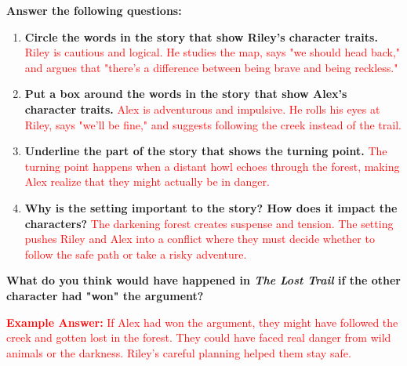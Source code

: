 \documentclass[12pt]{article}
\begin{document}
\begin{tcolorbox}[colframe=black!60, colback=white, 
coltitle=black, colbacktitle=black!15, fonttitle=\bfseries\Large, 
title=Independent Practice: \textit{The Lost Trail}, halign title=center, left=10pt, right=10pt, top=10pt, bottom=15pt]

\textbf{Answer the following questions:}
\begin{enumerate}[itemsep=1em]
    \item \textbf{Circle the words in the story that show Riley's character traits.}  
    \textcolor{red}{Riley is cautious and logical. He studies the map, says "we should head back," and argues that "there’s a difference between being brave and being reckless."}  

    \item \textbf{Put a box around the words in the story that show Alex's character traits.}  
    \textcolor{red}{Alex is adventurous and impulsive. He rolls his eyes at Riley, says "we’ll be fine," and suggests following the creek instead of the trail.}  

    \item \textbf{Underline the part of the story that shows the turning point.}  
    \textcolor{red}{The turning point happens when a distant howl echoes through the forest, making Alex realize that they might actually be in danger.}  

    \item \textbf{Why is the setting important to the story? How does it impact the characters?}  
    \textcolor{red}{The darkening forest creates suspense and tension. The setting pushes Riley and Alex into a conflict where they must decide whether to follow the safe path or take a risky adventure.}
\end{enumerate}
\end{tcolorbox}

\vspace{1em}

\begin{tcolorbox}[colframe=black!60, colback=white, 
coltitle=black, colbacktitle=black!15, fonttitle=\bfseries\Large, 
title=Exit Ticket, halign title=center, left=10pt, right=10pt, top=10pt, bottom=15pt]

\textbf{What do you think would have happened in \textit{The Lost Trail} if the other character had "won" the argument?}  

\textcolor{red}{\textbf{Example Answer:} If Alex had won the argument, they might have followed the creek and gotten lost in the forest. They could have faced real danger from wild animals or the darkness. Riley’s careful planning helped them stay safe.}
\end{tcolorbox}
\end{document}
